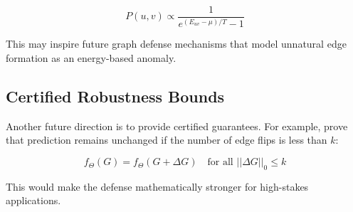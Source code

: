 \documentclass[12pt,a4paper]{article}
\begin{document}
$$
P(u,v)\propto \frac{1}{e^{(E_{uv}-\mu)/T}-1}
$$

This may inspire future graph defense mechanisms that model unnatural edge formation as an energy-based anomaly.

\subsection{Certified Robustness Bounds}
Another future direction is to provide certified guarantees. For example, prove that prediction remains unchanged if the number of edge flips is less than $k$:

$$
f_\Theta(G)=f_\Theta(G+\Delta G)\quad \text{for all } ||\Delta G||_0\leq k
$$

This would make the defense mathematically stronger for high-stakes applications.
\end{document}
